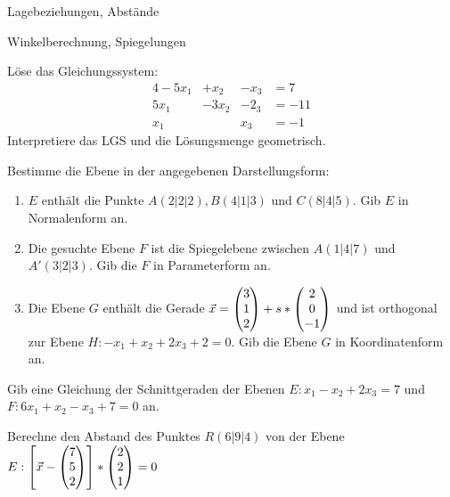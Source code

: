 

\newcommand{\vektor}[1]{\ensuremath\begin{pmatrix} #1 \end{pmatrix}}


\begin{inhalt}
	\item Lagebeziehungen, Abstände
	\item Winkelberechnung, Spiegelungen
\end{inhalt}

Löse das Gleichungssystem:
\begin{alignat*}{4}
	-5x_1& +x_2& -x_3& = 7\\
	5x_1&  -3x_2& -2_3& = -11\\
	x_1& & x_3& =-1
\end{alignat*}
Interpretiere das LGS und die Lösungsmenge geometrisch.

Bestimme die Ebene in der angegebenen Darstellungsform:
\begin{enumerate}
	\item $E$ enthält die Punkte $A(2|2|2), B(4|1|3)$ und $C(8|4|5)$. Gib $E$ in Normalenform an. %
	\item Die gesuchte Ebene $F$ ist die Spiegelebene zwischen $A(1|4|7)$ und $A'(3|2|3)$. Gib die $F$ in Parameterform an. %
	\item Die Ebene $G$ enthält die Gerade $\vec x = \vektor{3\\1\\2}+s*\vektor{2\\0\\-1}$ und ist orthogonal zur Ebene $H:-x_1+x_2+2x_3+2=0$. Gib die Ebene $G$ in Koordinatenform an. %
\end{enumerate}

Gib eine Gleichung der Schnittgeraden der Ebenen $E: x_1-x_2+2x_3=7$ und $F:6x_1+x_2-x_3+7=0$ an.

Berechne den Abstand des Punktes $R(6|9|4)$ von der Ebene $E: \left[ \vec x -  \vektor{7 \\ 5\\ 2}\right]*\vektor{2\\ 2 \\1}=0$

